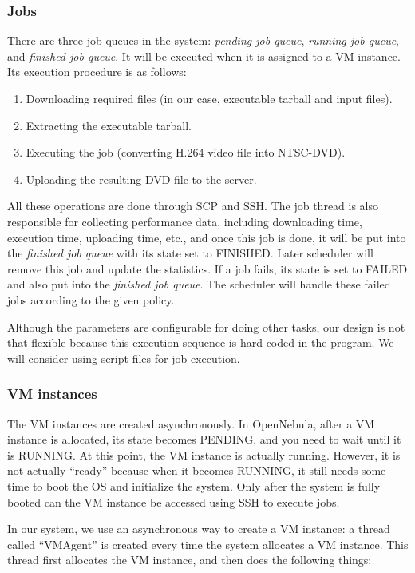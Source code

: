 \subsubsection{Jobs}
There are three job queues in the system: \emph{pending job queue}, \emph{running job queue}, and \emph{finished job queue}. It will be executed when it is assigned to a VM instance. Its execution procedure is as follows:

\begin{enumerate}
\item Downloading required files (in our case, executable tarball and input files).
\item Extracting the executable tarball.
\item Executing the job (converting H.264 video file into NTSC-DVD).
\item Uploading the resulting DVD file to the server.
\end{enumerate}

All these operations are done through SCP and SSH. The job thread is also responsible for collecting performance data, including downloading time, execution time, uploading time, etc., and once this job is done, it will be put into the \emph{finished job queue} with its state set to FINISHED. Later scheduler will remove this job and update the statistics. If a job fails, its state is set to FAILED and also put into the \emph{finished job queue}. The scheduler will handle these failed jobs according to the given policy.

Although the parameters are configurable for doing other tasks, our design is not that flexible because this execution sequence is hard coded in the program. We will consider using script files for job execution.


\subsubsection{VM instances}
The VM instances are created asynchronously. In OpenNebula, after a VM instance is allocated, its state becomes PENDING, and you need to wait until it is RUNNING. At this point, the VM instance is actually running. However, it is not actually ``ready'' because when it becomes RUNNING, it still needs some time to boot the OS and initialize the system. Only after the system is fully booted can the VM instance be accessed using SSH to execute jobs.

In our system, we use an asynchronous way to create a VM instance: a thread called ``VMAgent'' is created every time the system allocates a VM instance. This thread first allocates the VM instance, and then does the following things:

